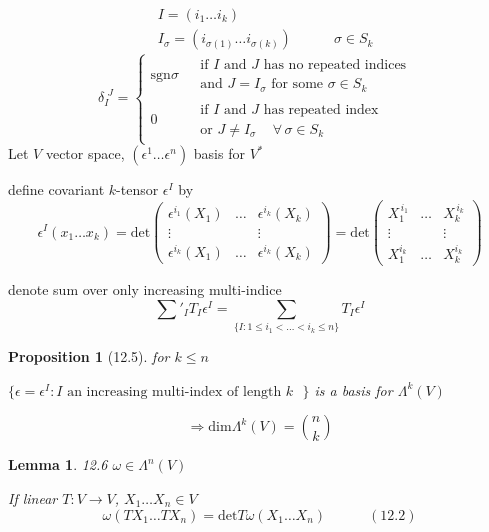 \documentclass[11pt]{amsart}
\newtheorem{lemma}{Lemma}
\newtheorem{proposition}{Proposition}
\theoremstyle{definition}
\begin{document}
\[
\begin{aligned}
  & I = (i_1 \dots i_k) \\
  & I_{\sigma} = (i_{\sigma(1)} \dots i_{\sigma(k)} ) \quad \quad \quad \sigma \in S_k
\end{aligned}
\]
\[
\delta_I^{ \, \, J} = \begin{cases} \text{sgn}{\sigma} & \begin{gathered} \text{ if $I$ and $J$ has no repeated indices }\\
    \text{ and $J = I_{\sigma}$ for some $\sigma \in S_k$ } \end{gathered} \\
  0 & \begin{gathered} \text{ if $I$ and $J$ has repeated index } \\
    \text{ or $J \neq I_{\sigma} \quad \, \forall \, \sigma \in S_k $ } \end{gathered}
\end{cases}
\]
Let $V$ vector space, $(\epsilon^1 \dots \epsilon^n)$ basis for $V^*$

define covariant $k$-tensor $\epsilon^I$ by
\[
\epsilon^I(x_1 \dots x_k) = \text{det}{ \left( \begin{matrix} \epsilon^{i_1}(X_1)  & \dots & \epsilon^{i_k}(X_k) \\
    \vdots & & \vdots \\ \epsilon^{i_k}(X_1) & \dots  & \epsilon^{i_k}(X_k) \end{matrix} \right) } = \text{det}{ \left( \begin{matrix} X_1^{\, i_1} & \dots & X_k^{\, i_k }  \\ \vdots &  & \vdots \\ X_1^{i_k} & \dots & X_k^{i_k} \end{matrix} \right) }
\]

denote sum over only increasing multi-indice
\[
\sum'_I T_I \epsilon^I = \sum_{ \lbrace I : 1\leq i_1 < \dots < i_k \leq n \rbrace } T_I \epsilon^I
\]

\begin{proposition}[12.5] for $k\leq n$

$\lbrace \epsilon =  \epsilon^I : I \text{ an increasing multi-index of length $k$ } \rbrace$ is a basis for $\Lambda^k(V)$
\end{proposition}
\[
\Longrightarrow \text{dim}{ \Lambda^k(V) }= \binom{n}{k}
\]



\begin{lemma}{12.6} $\omega \in \Lambda^n(V)$

If linear $T: V \to V$, $X_1 \dots X_n \in V$
\begin{equation}
  \omega(TX_1 \dots TX_n) = \text{det}{T} \omega(X_1 \dots X_n) \quad \quad \quad (12.2)
\end{equation}

\end{lemma}
\end{document}
